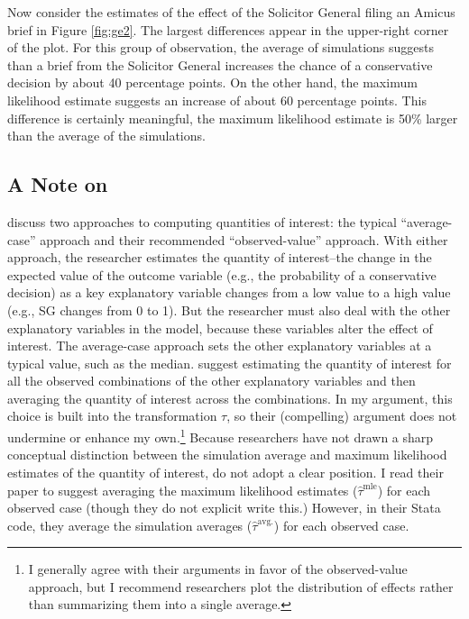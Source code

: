 \documentclass[10pt]{article}
\begin{document}
Now consider the estimates of the effect of the Solicitor General filing an Amicus brief in Figure \ref{fig:ge2}.
The largest differences appear in the upper-right corner of the plot.
For this group of observation, the average of simulations suggests than a brief from the Solicitor General increases the chance of a conservative decision by about 40 percentage points. 
On the other hand, the maximum likelihood estimate suggests an increase of about 60 percentage points. 
This difference is certainly meaningful, the maximum likelihood estimate is 50\% larger than the average of the simulations.

\subsection*{A Note on \cite{HanmerKalkan2013}}

\cite{HanmerKalkan2013} discuss two approaches to computing quantities of interest: the typical ``average-case'' approach and their recommended ``observed-value'' approach. With either approach, the researcher estimates the quantity of interest--the change in the expected value of the outcome variable (e.g., the probability of a conservative decision) as a key explanatory variable changes from a low value to a high value (e.g., SG changes from 0 to 1). But the researcher must also deal with the other explanatory variables in the model, because these variables alter the effect of interest. The average-case approach sets the other explanatory variables at a typical value, such as the median. \cite{HanmerKalkan2013} suggest estimating the quantity of interest for all the observed combinations of the other explanatory variables and then averaging the quantity of interest across the combinations. 
\cite{HanmerKalkan2013} 
In my argument, this choice is built into the transformation $\tau$, so their (compelling) argument does not undermine or enhance my own.\footnote{I generally agree with their arguments in favor of the observed-value approach, but I recommend researchers plot the distribution of effects rather than summarizing them into a single average.} Because researchers have not drawn a sharp conceptual distinction between the simulation average and maximum likelihood estimates of the quantity of interest, \cite{HanmerKalkan2013} do not adopt a clear position. I read their paper to suggest averaging the maximum likelihood estimates ($\hat{\tau}^\text{mle}$) for each observed case (though they do not explicit write this.) However, in their Stata code, they average the simulation averages ($\hat{\tau}^\text{avg.}$) for each observed case.
\end{document}
